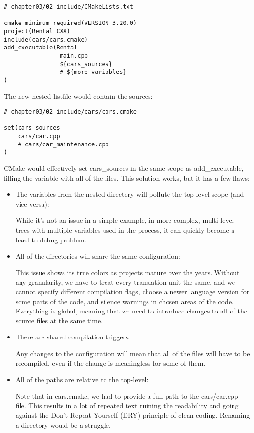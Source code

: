 \begin{lstlisting}[style=styleCMake]
# chapter03/02-include/CMakeLists.txt

cmake_minimum_required(VERSION 3.20.0)
project(Rental CXX)
include(cars/cars.cmake)
add_executable(Rental
				main.cpp
				${cars_sources}
				# ${more variables}
)
\end{lstlisting}

The new nested listfile would contain the sources:

\begin{lstlisting}[style=styleCMake]
# chapter03/02-include/cars/cars.cmake

set(cars_sources
	cars/car.cpp
	# cars/car_maintenance.cpp
)
\end{lstlisting}

CMake would effectively set cars\_sources in the same scope as add\_executable, filling the variable with all of the files. This solution works, but it has a few flaws:

\begin{itemize}
\item 
The variables from the nested directory will pollute the top-level scope (and vice versa): 

While it's not an issue in a simple example, in more complex, multi-level trees with multiple variables used in the process, it can quickly become a hard-to-debug problem.

\item 
All of the directories will share the same configuration:

This issue shows its true colors as projects mature over the years. Without any granularity, we have to treat every translation unit the same, and we cannot specify different compilation flags, choose a newer language version for some parts of the code, and silence warnings in chosen areas of the code. Everything is global, meaning that we need to introduce changes to all of the source files at the same time.

\item 
There are shared compilation triggers:

Any changes to the configuration will mean that all of the files will have to be recompiled, even if the change is meaningless for some of them.

\item 
All of the paths are relative to the top-level:

Note that in cars.cmake, we had to provide a full path to the cars/car.cpp file. This results in a lot of repeated text ruining the readability and going against the Don't Repeat Yourself (DRY) principle of clean coding. Renaming a directory would be a struggle.
\end{itemize}

